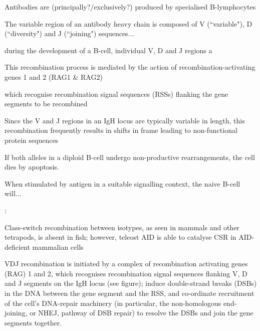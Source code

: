 Antibodies are (principally?/exclusively?) produced by specialised B-lymphocytes%

The variable region of an antibody heavy chain is composed of V (``variable"), D (``diversity") and J (``joining") sequences... %

during the development of a B-cell, individual V, D and J regions a

This recombination process is mediated by the action of recombination-activating genes 1 and 2 (RAG1 \& RAG2)%

which recognise recombination signal sequences (RSSs) flanking the gene segments to be recombined %

Since the V and J regions in an IgH locus are typically variable in length, this recombination frequently results in shifts in frame leading to non-functional protein sequences%

If both alleles in a diploid B-cell undergo non-productive rearrangements, the cell dies by apoptosis. 


When stimulated by antigen in a suitable signalling context, the naive B-cell will...



\citep{patel2018aid}:

Class-switch recombination between isotypes, as seen in mammals and other tetrapods, is absent in fish; however, teleost AID is able to catalyse CSR in AID-deficient mammalian cells%

VDJ recombination is initiated by a complex of recombination activating genes (RAG) 1 and 2, which recognises recombination signal sequences flanking V, D and J segments on the IgH locus (see figure); induce double-strand breaks (DSBs) in the DNA between the gene segment and the RSS, and co-ordinate recruitment of the cell's DNA-repair machinery (in particular, the non-homologous end-joining, or NHEJ, pathway of DSB repair) to resolve the DSBs and join the gene segments together. %

